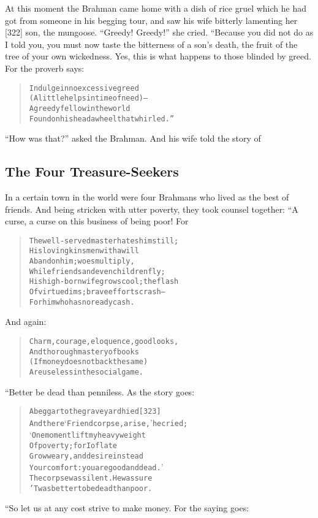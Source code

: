 \documentclass[article, twoside, 14pt]{memoir}
\renewenvironment{verbatim}{%
\begin{quote}%
\vskip -10pt%
\begin{alltt}\normalfont\large}{\end{alltt}%
\end{quote}%
\vskip -10pt
} %
\begin{document}
At this moment the Brahman came home with a dish of rice gruel
which he had got from someone in his begging tour, and saw his wife
bitterly lamenting her [322] son, the mungoose. ``Greedy! Greedy!''
she cried. “Because you did not do as I told you, you must now
taste the bitterness of a son's death, the fruit of the tree of
your own wickedness. Yes, this is what happens to those blinded by
greed. For the proverb says:

\begin{verbatim}
Indulge in no excessive greed
(A little helps in time of need)--
A greedy fellow in the world
Found on his head a wheel that whirled.”
\end{verbatim}
``How was that?'' asked the Brahman. And his wife told the story
of

\subsection{The Four Treasure-Seekers}

\label{s81}

In a certain town in the world were four Brahmans who lived as the
best of friends. And being stricken with utter poverty, they took
counsel together: “A curse, a curse on this business of being poor!
For

\begin{verbatim}
The well-served master hates him still;
His loving kinsmen with a will
Abandon him; woes multiply,
While friends and even children fly;
His high-born wife grows cool; the flash
Of virtue dims; brave efforts crash--
For him who has no ready cash.
\end{verbatim}
And again:

\begin{verbatim}
Charm, courage, eloquence, good looks,
And thorough mastery of books
(If money does not back the same)
Are useless in the social game.
\end{verbatim}
“Better be dead than penniless. As the story goes:

\begin{verbatim}
A beggar to the graveyard hied                          [323]
And there ‘Friend corpse, arise,’ he cried;
‘One moment lift my heavy weight
Of poverty; for I of late
Grow weary, and desire instead
Your comfort: you are good and dead.’
The corpse was silent. He was sure
'Twas better to be dead than poor.
\end{verbatim}
“So let us at any cost strive to make money. For the saying goes:
\end{document}
